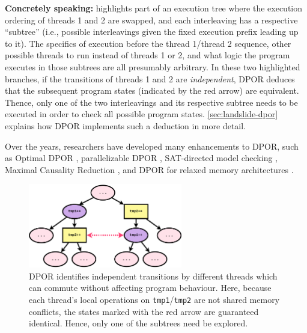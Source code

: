 {\bf Concretely speaking:}
 highlights part of an execution tree where the execution ordering of threads 1 and 2 are swapped,
and each interleaving has a respective ``subtree'' (i.e., possible interleavings given the fixed execution prefix leading up to it).
The specifics of execution before the thread 1/thread 2 sequence,
other possible threads to run instead of threads 1 or 2,
and what logic the program executes in those subtrees
are all presumably arbitrary.
In these two highlighted branches,
if the transitions of threads 1 and 2 are {\em independent},
DPOR deduces that the subsequent program states (indicated by the red arrow) are equivalent.
Thence, only one of the two interleavings and its respective subtree needs to be executed
in order to check all possible program states.
\cref{sec:landslide-dpor} explains how DPOR implements such a deduction in more detail.

Over the years, researchers have developed many enhancements to DPOR, such as Optimal DPOR \cite{optimal-dpor}, parallelizable DPOR \cite{parallel-dpor}, SAT-directed model checking \cite{satcheck}, Maximal Causality Reduction \cite{mcr}, and DPOR for relaxed memory architectures \cite{tsopso}.

\begin{figure}[t]
	\begin{center}
	\includegraphics[width=0.6\textwidth]{dpor-new-colors.pdf}
	\end{center}
	\caption[DPOR identifies independent transitions by different threads.]
		{DPOR identifies independent transitions by different threads which can commute
	without affecting program behaviour.
	Here, because each thread's local operations on {\tt tmp1}/{\tt tmp2} are not shared memory conflicts,
	the states marked with the red arrow are guaranteed identical. Hence, only one of the subtrees need be explored.}
	\label{fig:dpor}
\end{figure}

